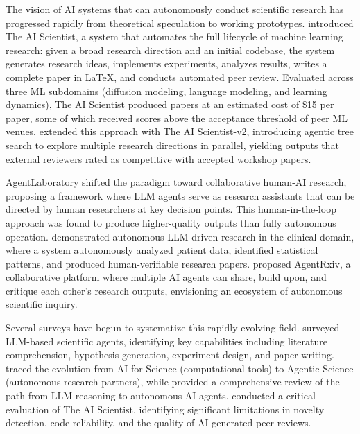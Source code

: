 \documentclass{article}
\begin{document}
The vision of AI systems that can autonomously conduct scientific research has progressed rapidly from theoretical speculation to working prototypes. \citet{lu2024ai_scientist} introduced The AI Scientist, a system that automates the full lifecycle of machine learning research: given a broad research direction and an initial codebase, the system generates research ideas, implements experiments, analyzes results, writes a complete paper in \LaTeX, and conducts automated peer review. Evaluated across three ML subdomains (diffusion modeling, language modeling, and learning dynamics), The AI Scientist produced papers at an estimated cost of \$15 per paper, some of which received scores above the acceptance threshold of peer ML venues. \citet{yamada2025ai_scientist_v2} extended this approach with The AI Scientist-v2, introducing agentic tree search to explore multiple research directions in parallel, yielding outputs that external reviewers rated as competitive with accepted workshop papers.

AgentLaboratory \citep{schmidgall2025agentlab} shifted the paradigm toward collaborative human-AI research, proposing a framework where LLM agents serve as research assistants that can be directed by human researchers at key decision points. This human-in-the-loop approach was found to produce higher-quality outputs than fully autonomous operation. \citet{ifargan2025autonomous} demonstrated autonomous LLM-driven research in the clinical domain, where a system autonomously analyzed patient data, identified statistical patterns, and produced human-verifiable research papers. \citet{schmidgall2025agentrxiv} proposed AgentRxiv, a collaborative platform where multiple AI agents can share, build upon, and critique each other's research outputs, envisioning an ecosystem of autonomous scientific inquiry.

Several surveys have begun to systematize this rapidly evolving field. \citet{ren2025scientific_intelligence} surveyed LLM-based scientific agents, identifying key capabilities including literature comprehension, hypothesis generation, experiment design, and paper writing. \citet{wei2025agentic_science} traced the evolution from AI-for-Science (computational tools) to Agentic Science (autonomous research partners), while \citet{ferrag2025llm_agents} provided a comprehensive review of the path from LLM reasoning to autonomous AI agents. \citet{beel2025evaluating} conducted a critical evaluation of The AI Scientist, identifying significant limitations in novelty detection, code reliability, and the quality of AI-generated peer reviews.
\end{document}
